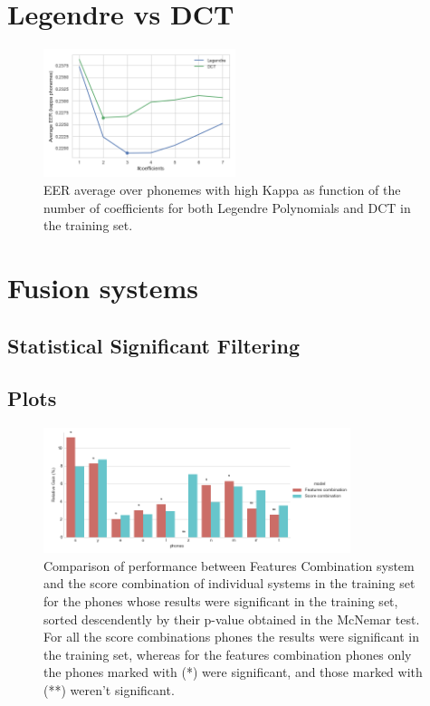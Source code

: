 \section{Legendre vs DCT}

\begin{figure}[H]
	\centering
	\includegraphics[width=0.5\textwidth]{files/figures/results/legendre-dct/legendre-dct-coefficients.png}
	\caption{EER average over phonemes with high Kappa as function of the number of coefficients
	for both Legendre Polynomials and DCT in the training set.}
	\label{fig:legendreVsDCT}
\end{figure}


\section{Fusion systems}

\subsection{Statistical Significant Filtering}

\subsection{Plots}

\begin{figure}[H]
	\centering
	\includegraphics[width=0.8\textwidth]{files/figures/results/relatives/relatives-fusion-systems-dev-mcnemar.png}
	\caption{Comparison of performance between Features Combination system and the score combination
	of individual systems in the training set for the phones whose results were significant
	in the training set, sorted descendently by their p-value obtained in the McNemar test.
	For all the score combinations phones the results were significant in the training set,
	whereas for the features combination phones only the phones marked with (*) were significant,
	and those marked with (**) weren't significant.}
	\label{fig:fusionMcnemarDev}
\end{figure}

